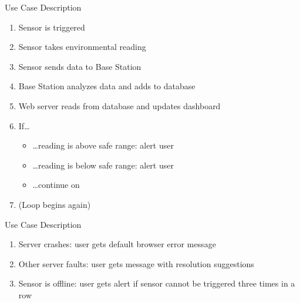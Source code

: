 \documentclass{beamer}
\begin{document}
  \begin{frame}{\sectitle}{Use Case Description}
    {\par}
    \begin{enumerate}
      \item Sensor is triggered
      \item Sensor takes environmental reading
      \item Sensor sends data to Base Station
      \item Base Station analyzes data and adds to database
      \item Web server reads from database and updates dashboard
      \item If\dots
      \begin{itemize}
        \item \dots reading is above safe range: alert user
        \item \dots reading is below safe range: alert user
        \item \dots continue on
      \end{itemize}
      \item (Loop begins again)
    \end{enumerate}
  \end{frame}

  \begin{frame}{\sectitle}{Use Case Description}
    {\par}
    \begin{enumerate}
      \item Server crashes: user gets default browser error message
      \item Other server faults: user gets message with resolution suggestions
      \item Sensor is offline: user gets alert if sensor cannot be triggered three times in a row
    \end{enumerate}
  \end{frame}

\end{document}

